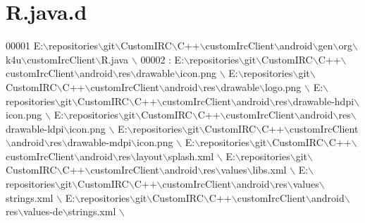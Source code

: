 \hypertarget{_r_8java_8d}{\section{R.\-java.\-d}
\label{d6/d30/_r_8java_8d}
}

\begin{DoxyCode}
00001 E:\(\backslash\)repositories\(\backslash\)git\(\backslash\)CustomIRC\(\backslash\)C++\(\backslash\)customIrcClient\(\backslash\)android\(\backslash\)gen\(\backslash\)org\(\backslash\)k4u\(\backslash\)customIrcClient\(\backslash\)R.java \(\backslash\)
00002  : E:\(\backslash\)repositories\(\backslash\)git\(\backslash\)CustomIRC\(\backslash\)C++\(\backslash\)customIrcClient\(\backslash\)android\(\backslash\)res\(\backslash\)drawable\(\backslash\)icon.png \(\backslash\)
E:\(\backslash\)repositories\(\backslash\)git\(\backslash\)CustomIRC\(\backslash\)C++\(\backslash\)customIrcClient\(\backslash\)android\(\backslash\)res\(\backslash\)drawable\(\backslash\)logo.png \(\backslash\)
E:\(\backslash\)repositories\(\backslash\)git\(\backslash\)CustomIRC\(\backslash\)C++\(\backslash\)customIrcClient\(\backslash\)android\(\backslash\)res\(\backslash\)drawable-hdpi\(\backslash\)icon.png \(\backslash\)
E:\(\backslash\)repositories\(\backslash\)git\(\backslash\)CustomIRC\(\backslash\)C++\(\backslash\)customIrcClient\(\backslash\)android\(\backslash\)res\(\backslash\)drawable-ldpi\(\backslash\)icon.png \(\backslash\)
E:\(\backslash\)repositories\(\backslash\)git\(\backslash\)CustomIRC\(\backslash\)C++\(\backslash\)customIrcClient\(\backslash\)android\(\backslash\)res\(\backslash\)drawable-mdpi\(\backslash\)icon.png \(\backslash\)
E:\(\backslash\)repositories\(\backslash\)git\(\backslash\)CustomIRC\(\backslash\)C++\(\backslash\)customIrcClient\(\backslash\)android\(\backslash\)res\(\backslash\)layout\(\backslash\)splash.xml \(\backslash\)
E:\(\backslash\)repositories\(\backslash\)git\(\backslash\)CustomIRC\(\backslash\)C++\(\backslash\)customIrcClient\(\backslash\)android\(\backslash\)res\(\backslash\)values\(\backslash\)libs.xml \(\backslash\)
E:\(\backslash\)repositories\(\backslash\)git\(\backslash\)CustomIRC\(\backslash\)C++\(\backslash\)customIrcClient\(\backslash\)android\(\backslash\)res\(\backslash\)values\(\backslash\)strings.xml \(\backslash\)
E:\(\backslash\)repositories\(\backslash\)git\(\backslash\)CustomIRC\(\backslash\)C++\(\backslash\)customIrcClient\(\backslash\)android\(\backslash\)res\(\backslash\)values-de\(\backslash\)strings.xml \(\backslash\)

\end{DoxyCode}

